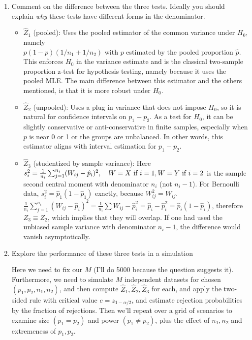 \documentclass[10pt]{article}
\begin{document}
\begin{enumerate}[label=(\roman*)]
    \item Comment on the difference between the three tests. Ideally you should explain \textit{why} these tests have different forms in the denominator.
    
    \begin{itemize}
        \item $\hat{Z}_1 $ (pooled): Uses the pooled estimator of the common variance under $H_0 $, namely \\$p(1 - p)(1 / n_1 + 1 / n_2)$ with $p $ estimated by the pooled proportion $\hat{p}$. This enforces $H_0 $ in the variance estimate and is the classical two-sample proportion z-test for hypothesis testing, namely because it uses the pooled MLE. The main difference between this estimator and the others mentioned, is that it is more robust under $H_0 $.
        \item $\hat{Z}_2 $ (unpooled): Uses a plug-in variance that does not impose $H_0 $, so it is natural for confidence intervals on $p_1 - p_2 $. As a test for $H_0 $, it can be slightly conservative or anti-conservative in finite samples, especially when $p $ is near 0 or 1 or the groups are unbalanced. In other words, this estimator aligns with interval estimation for $p_1 - p_2 $.
        \item $\hat{Z}_3 $ (studentized by sample variance): Here $s_i^2 = \frac{1}{n_i}\sum_{j = 1}^{n_i}(W_{ij} - \hat{p}_i)^2 , \quad W = X \text{ if } i = 1, \\W = Y \text{ if } i = 2$ is the sample second central moment with denominator $n_i $ (not $n_i - 1 $). For Bernoulli data, $s_i^2 = \hat{p}_1(1 - \hat{p}_1)$ exactly, because $W_{ij}^2 = W_{ij}$. \\$\frac{1}{n_i}\sum_{j = 1}^{n_i}(W_{ij} - \hat{p}_i)^2 = \frac{1}{n_i}\sum W_{ij} - \hat{p}_i^2 = \hat{p}_i - \hat{p}_i^2 = \hat{p}_i(1 - \hat{p}_i)$, therefore $Z_3 \equiv Z_2 $, which implies that they will overlap. If one had used the unbiased sample variance with denominator $n_i - 1 $, the difference would vanish asymptotically.
    \end{itemize}
    
    \item Explore the performance of these three tests in a simulation
    
    Here we need to fix our $M $ (I'll do 5000 because the question suggests it). Furthermore, we need to simulate $M$ independent datasets for chosen $(p_1, p_2, n_1, n_2)$, and then compute $\hat{Z}_1, \hat{Z}_2, \hat{Z}_3 $ for each, and apply the two-sided rule with critical value $c = z_{1 - \alpha / 2}$, and estimate rejection probabilities by the fraction of rejections. Then we'll repeat over a grid of scenarios to examine size $(p_1 = p_2)$ and power $(p_1 \neq p_2)$, plus the effect of $n_1, n_2 $ and extremeness of $p_1, p_2 $.
    

\end{enumerate}
\end{document}
